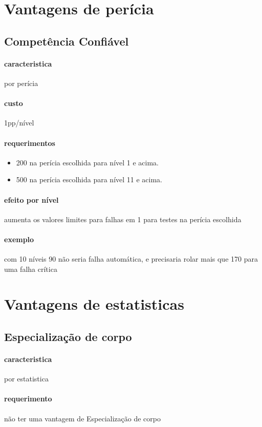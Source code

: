 \section{Vantagens de perícia}
%
%
\subsection{Competência Confiável}
\paragraph{caracteristica} por perícia
\paragraph{custo} 1pp/nível
\paragraph{requerimentos}
\begin{itemize}
  \item 200 na perícia escolhida para nível 1 e acima.
  \item 500 na perícia escolhida para nível 11 e acima.
\end{itemize}
\paragraph{efeito por nível} aumenta os valores limites para falhas em 1 para testes na perícia escolhida
\paragraph{exemplo} com 10 níveis 90 não seria falha automática, e precisaria rolar mais que 170 para uma falha crítica
%
%
\section{Vantagens de estatisticas}
%
\subsection{Especialização de corpo}
\paragraph{caracteristica} por estatistica
\paragraph{requerimento} não ter uma vantagem de Especialização de corpo
